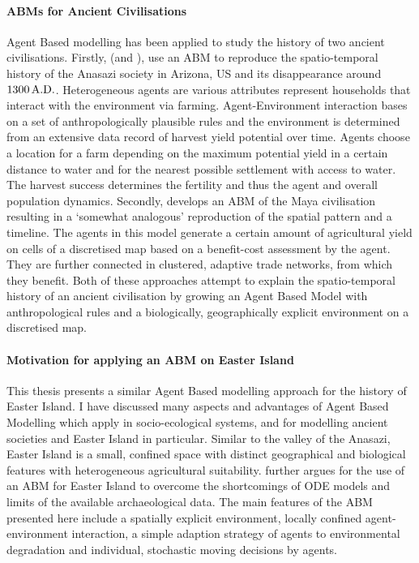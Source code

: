 \paragraph{ABMs for Ancient Civilisations}
Agent Based modelling has been applied to study the history of two ancient civilisations.
Firstly, \citet{Axtell2002} (and \citet{Janssen2009}), use an ABM to reproduce the spatio-temporal history of the Anasazi society in Arizona, US and its disappearance around $1300\, {\rm A.D.}$. 
Heterogeneous agents are various attributes represent households that interact with the environment via farming. 
Agent-Environment interaction bases on a set of anthropologically plausible rules and the environment is determined from an extensive data record of harvest yield potential over time. 
Agents choose a location for a farm depending on the maximum potential yield in a certain distance to water and for the nearest possible settlement with access to water. The harvest success determines the fertility and thus the agent and overall population dynamics.
Secondly, \citet{Heckbert2013} develops an ABM of the Maya civilisation resulting in a `somewhat analogous' reproduction of the spatial pattern and a timeline.
The agents in this model generate a certain amount of agricultural yield on cells of a discretised map based on a benefit-cost assessment by the agent. 
They are further connected in clustered, adaptive trade networks, from which they benefit.
Both of these approaches attempt to explain the spatio-temporal history of an ancient civilisation by growing an Agent Based Model with anthropological rules and a biologically, geographically explicit environment on a discretised map.


\paragraph{Motivation for applying an ABM on Easter Island}
This thesis presents a similar Agent Based modelling approach for the history of Easter Island.
I have discussed many aspects and advantages of Agent Based Modelling which apply in socio-ecological systems, and for modelling ancient societies and Easter Island in particular.
Similar to the valley of the Anasazi, Easter Island is a small, confined space with distinct geographical and biological features with heterogeneous agricultural suitability.
\citet{Merico2017} further argues for the use of an ABM for Easter Island to overcome the shortcomings of ODE models and limits of the available archaeological data.
The main features of the ABM presented here include a spatially explicit environment, locally confined agent-environment interaction, a simple adaption strategy of agents to environmental degradation and individual, stochastic moving decisions by agents.


